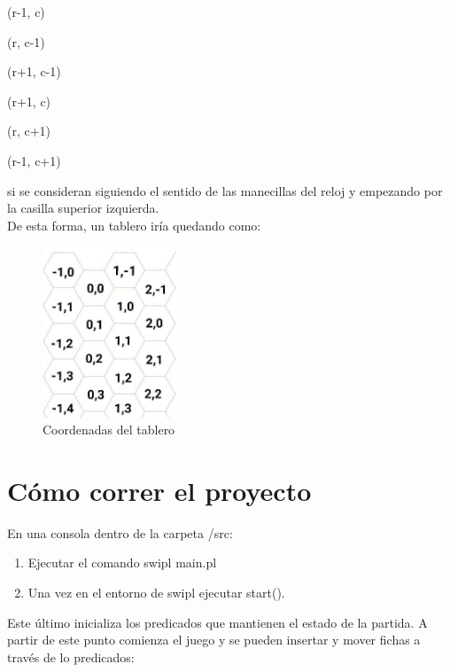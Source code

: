 \documentclass[runningheads,a4paper]{llncs}
\begin{document}
(r-1, c)

(r, c-1)

(r+1, c-1)

(r+1, c)

(r, c+1)

(r-1, c+1)

si se consideran siguiendo el sentido de las manecillas del reloj y empezando por la casilla superior izquierda.\\[20cm]

De esta forma, un tablero ir\'ia quedando como:

\begin{figure}
	\centering
	\includegraphics[width = 4cm]{images/board}
	\caption{Coordenadas del tablero}\label{fig:lcc1}
\end{figure}

\section{C\'omo correr el proyecto}
En una consola dentro de la carpeta /src:
\begin{enumerate}
	\item Ejecutar el comando swipl main.pl 
	\item Una vez en el entorno de swipl ejecutar start().
\end{enumerate} 

Este \'ultimo inicializa los predicados que mantienen el estado de la partida. A partir de este punto comienza el juego y se pueden insertar y mover fichas a trav\'es de lo predicados:
\end{document}
